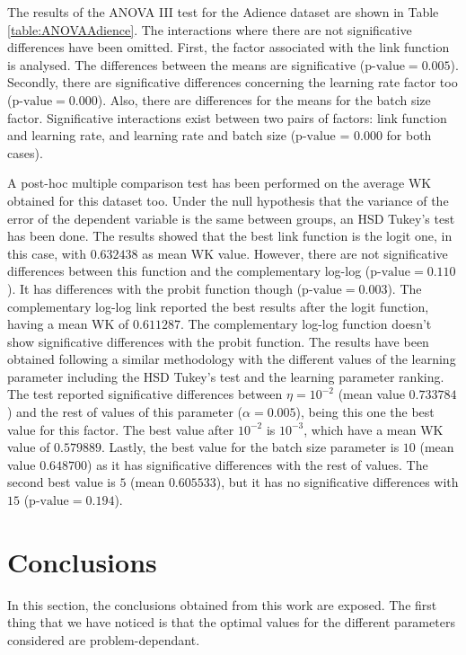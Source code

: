 \documentclass[10pt, a4paper, titlepage, twocolumn]{article}
\begin{document}
	The results of the ANOVA III test for the Adience dataset are shown in Table \ref{table:ANOVAAdience}. The interactions where there are not significative differences have been omitted. First, the factor associated with the link function is analysed. The differences between the means are significative ($\text{p-value} = 0.005$). Secondly, there are significative differences concerning the learning rate factor too ($\text{p-value} = 0.000$). Also, there are differences for the means for the batch size factor. Significative interactions exist between two pairs of factors: link function and learning rate, and learning rate and batch size ($\text{p-value = 0.000}$ for both cases).
	
	A post-hoc multiple comparison test has been performed on the average WK obtained for this dataset too. Under the null hypothesis that the variance of the error of the dependent variable is the same between groups, an HSD Tukey's test has been done. The results showed that the best link function is the logit one, in this case, with $0.632438$ as mean WK value. However, there are not significative differences between this function and the complementary log-log ($\text{p-value}=0.110$). It has differences with the probit function though ($\text{p-value} = 0.003$). The complementary log-log link reported the best results after the logit function, having a mean WK of $0.611287$. The complementary log-log function doesn't show significative differences with the probit function.
	The results have been obtained following a similar methodology with the different values of the learning parameter including the HSD Tukey's test and the learning parameter ranking. The test reported significative differences between $\eta=10^{-2}$ (mean value $0.733784$) and the rest of values of this parameter ($\alpha=0.005$), being this one the best value for this factor. The best value after $10^{-2}$ is $10^{-3}$, which have a mean WK value of $0.579889$. Lastly, the best value for the batch size parameter is $10$ (mean value $0.648700$) as it has significative differences with the rest of values. The second best value is $5$ (mean $0.605533$), but it has no significative differences with $15$ ($\text{p-value}= 0.194$).
	
	\section{Conclusions}
	In this section, the conclusions obtained from this work are exposed. The first thing that we have noticed is that the optimal values for the different parameters considered are problem-dependant. 
	
\end{document}
